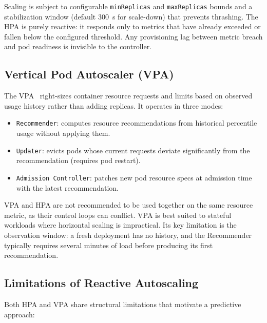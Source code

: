 Scaling is subject to configurable \texttt{minReplicas} and \texttt{maxReplicas}
bounds and a stabilization window (default 300~s for scale-down) that prevents
thrashing. The HPA is purely reactive: it responds only to metrics that have
already exceeded or fallen below the configured threshold. Any provisioning lag
between metric breach and pod readiness is invisible to the controller.

\subsection{Vertical Pod Autoscaler (VPA)}
\label{sec:vpa}

The \gls{VPA}~\cite{k8s-vpa} right-sizes container resource requests and limits
based on observed usage history rather than adding replicas. It operates in three
modes:
\begin{itemize}
  \item \texttt{Recommender}: computes resource recommendations from historical
  percentile usage without applying them.
  \item \texttt{Updater}: evicts pods whose current requests deviate significantly
  from the recommendation (requires pod restart).
  \item \texttt{Admission Controller}: patches new pod resource specs at admission
  time with the latest recommendation.
\end{itemize}
VPA and HPA are not recommended to be used together on the same resource metric,
as their control loops can conflict. VPA is best suited to stateful workloads where
horizontal scaling is impractical. Its key limitation is the observation window:
a fresh deployment has no history, and the Recommender typically requires several
minutes of load before producing its first recommendation.

\subsection{Limitations of Reactive Autoscaling}
\label{sec:reactive-limits}

Both HPA and VPA share structural limitations that motivate a predictive approach:


